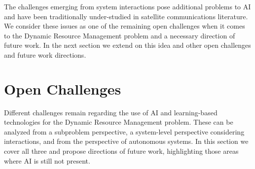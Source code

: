 \documentclass[letterpaper]{article} %
\begin{document}
The challenges emerging from system interactions pose additional problems to AI and have been traditionally under-studied in satellite communications literature. We consider these issues as one of the remaining open challenges when it comes to the Dynamic Resource Management problem and a necessary direction of future work. In the next section we extend on this idea and other open challenges and future work directions.













\section{Open Challenges}


Different challenges remain regarding the use of AI and learning-based technologies for the Dynamic Resource Management problem. These can be analyzed from a subproblem perspective, a system-level perspective considering interactions, and from the perspective of autonomous systems. In this section we cover all three and propose directions of future work, highlighting those areas where AI is still not present.
\end{document}
